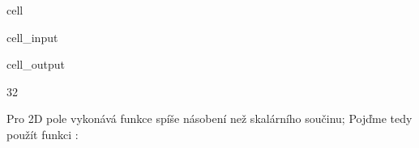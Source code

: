 \documentclass[letterpaper,10pt,english]{jupyterBook}
\begin{document}
\begin{sphinxuseclass}{cell}\begin{sphinxVerbatimInput}

\begin{sphinxuseclass}{cell_input}
\begin{sphinxVerbatim}[commandchars=\\\{\}]
\end{sphinxVerbatim}

\end{sphinxuseclass}\end{sphinxVerbatimInput}
\begin{sphinxVerbatimOutput}

\begin{sphinxuseclass}{cell_output}
\begin{sphinxVerbatim}[commandchars=\\\{\}]
32
\end{sphinxVerbatim}

\end{sphinxuseclass}\end{sphinxVerbatimOutput}

\end{sphinxuseclass}
\sphinxAtStartPar
Pro 2D pole vykonává funkce  spíše násobení než skalárního součinu; Pojďme tedy použít funkci :
\end{document}
